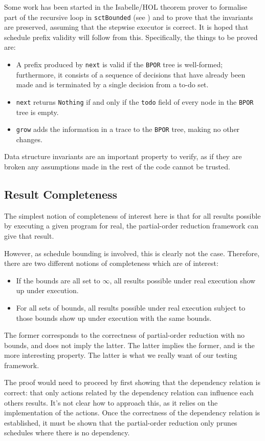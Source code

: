 Some work has been started in the Isabelle/HOL theorem prover to
formalise part of the recursive loop in \verb|sctBounded| (see
) and to prove that the invariants are preserved,
assuming that the stepwise executor is correct. It is hoped that
schedule prefix validity will follow from this. Specifically, the
things to be proved are:

\begin{itemize}
\item A prefix produced by \verb|next| is valid if the \verb|BPOR|
  tree is well-formed; furthermore, it consists of a sequence of
  decisions that have already been made and is terminated by a single
  decision from a to-do set.

\item \verb|next| returns \verb|Nothing| if and only if the
  \verb|todo| field of every node in the \verb|BPOR| tree is empty.

\item \verb|grow| adds the information in a trace to the \verb|BPOR|
  tree, making no other changes.
\end{itemize}

Data structure invariants are an important property to verify, as if
they are broken any assumptions made in the rest of the code cannot be
trusted.

\subsection{Result Completeness}
\label{sec:correctness-testing-complete}

The simplest notion of completeness of interest here is that for all
results possible by executing a given program for real, the
partial-order reduction framework can give that result.

However, as schedule bounding is involved, this is clearly not the
case. Therefore, there are two different notions of completeness which
are of interest:

\begin{itemize}
\item If the bounds are all set to $\infty$, all results possible
  under real execution show up under \dejafu{} execution.

\item For all sets of bounds, all results possible under real
  execution subject to those bounds show up under \dejafu{} execution
  with the same bounds.
\end{itemize}

The former corresponds to the correctness of partial-order reduction
with no bounds, and does not imply the latter. The latter implies the
former, and is the more interesting property. The latter is what we
really want of our testing framework.

The proof would need to proceed by first showing that the dependency
relation is correct: that only actions related by the dependency
relation can influence each others results. It's not clear how to
approach this, as it relies on the implementation of the actions. Once
the correctness of the dependency relation is established, it must be
shown that the partial-order reduction only prunes schedules where
there is no dependency.
